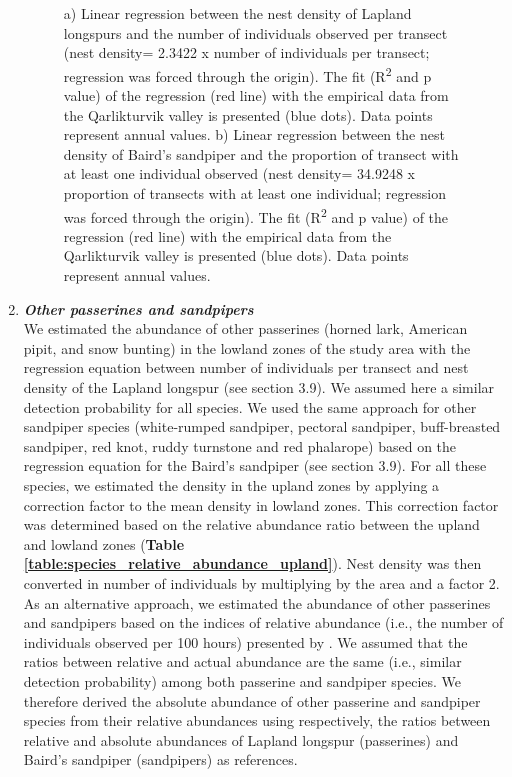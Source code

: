 \documentclass[a4paper,twoside,12pt]{article}
\begin{document}
\begin{enumerate}[label=\alph*.]
\begin{figure}[H]
\begin{subfigure}{0.5\textwidth}
        	\caption{}
        	\end{subfigure}
        	\caption{a) Linear regression between the nest density of Lapland longspurs and the number of individuals observed per transect (nest density= 2.3422 x number of individuals per transect; regression was forced through the origin). The fit (R\textsuperscript{2} and p value) of the regression (red line) with the empirical data from the Qarlikturvik valley is presented (blue dots). Data points represent annual values. b) Linear regression between the nest density of Baird’s sandpiper and the proportion of transect with at least one individual observed (nest density= 34.9248 x proportion of transects with at least one individual; regression was forced through the origin). The fit (R\textsuperscript{2} and p value) of the regression (red line) with the empirical data from the Qarlikturvik valley is presented (blue dots). Data points represent annual values.}
        	\label{figure:lalo_basa}
        	\end{figure} 

        	\item[] \textit{\textbf{Other passerines and sandpipers}}\\
        	We estimated the abundance of other passerines (horned lark, American pipit, and snow bunting) in the lowland zones of the study area with the regression equation between number of individuals per transect and nest density of the Lapland longspur (see section 3.9). We assumed here a similar detection probability for all species. We used the same approach for other sandpiper species (white-rumped sandpiper, pectoral sandpiper, buff-breasted sandpiper, red knot, ruddy turnstone and red phalarope) based on the regression equation for the Baird's sandpiper (see section 3.9). For all these species, we estimated the density in the upland zones by applying a correction factor to the mean density in lowland zones. This correction factor was determined based on the relative abundance ratio between the upland and lowland zones (\textbf{Table \ref{table:species_relative_abundance_upland}}). Nest density was then converted in number of individuals by multiplying by the area and a factor 2.
As an alternative approach, we estimated the abundance of other passerines and sandpipers based on the indices of relative abundance (i.e., the number of individuals observed per 100 hours) presented by \citet{gauthier2024a}. We assumed that the ratios between relative and actual abundance are the same (i.e., similar detection probability) among both passerine and sandpiper species. We therefore derived the absolute abundance of other passerine and sandpiper species from their relative abundances using respectively, the ratios between relative and absolute abundances of Lapland longspur (passerines) and Baird’s sandpiper (sandpipers) as references.


\end{enumerate}
\end{document}
